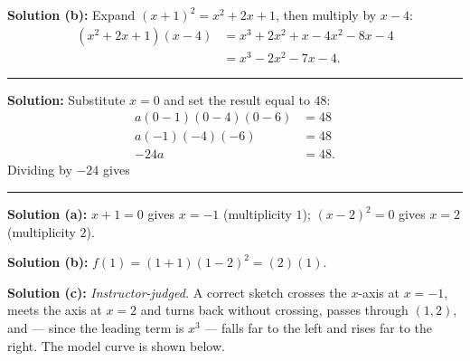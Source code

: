 \documentclass[12pt]{article}
\begin{document}
\textbf{Solution (b):} Expand $(x+1)^2 = x^2 + 2x + 1$, then multiply by $x - 4$:
\begin{align*}
  (x^2 + 2x + 1)(x - 4) &= x^3 + 2x^2 + x - 4x^2 - 8x - 4 \\
                        &= x^3 - 2x^2 - 7x - 4 .
\end{align*}

\vspace{0.25cm}\noindent\rule{\linewidth}{0.2pt}\vspace{0.25cm}


\textbf{Solution:} Substitute $x = 0$ and set the result equal to $48$:
\begin{align*}
  a(0-1)(0-4)(0-6) &= 48 \\
  a(-1)(-4)(-6) &= 48 \\
  -24a &= 48 .
\end{align*}
Dividing by $-24$ gives 

\vspace{0.25cm}\noindent\rule{\linewidth}{0.2pt}\vspace{0.25cm}


\textbf{Solution (a):} $x + 1 = 0$ gives $x = -1$ (multiplicity $1$); $(x-2)^2 = 0$
gives $x = 2$ (multiplicity $2$). 

\textbf{Solution (b):} $f(1) = (1+1)(1-2)^2 = (2)(1)$. 

\textbf{Solution (c):} \emph{Instructor-judged.} A correct sketch crosses the
$x$-axis at $x = -1$, meets the axis at $x = 2$ and turns back without crossing,
passes through $(1, 2)$, and --- since the leading term is $x^3$ --- falls far to
the left and rises far to the right. The model curve is shown below.

\begin{center}
\end{center}
\end{document}
